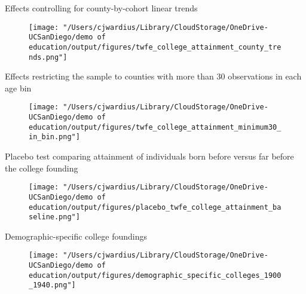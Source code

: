 \documentclass[notes,11pt, aspectratio=169]{beamer}
\begin{document}
\begin{frame}[label=county_trends]{Effects controlling for county-by-cohort linear trends}
  \begin{figure}
        \centering
        \texttt{[image: "/Users/cjwardius/Library/CloudStorage/OneDrive-UCSanDiego/demo of education/output/figures/twfe\_college\_attainment\_county\_trends.png"]}
    \end{figure}
    \centering
    \hyperlink{robustness}{}
\end{frame}

\begin{frame}[label=min30]{Effects restricting the sample to counties with more than 30 observations in each age bin}
  \begin{figure}
        \centering
        \texttt{[image: "/Users/cjwardius/Library/CloudStorage/OneDrive-UCSanDiego/demo of education/output/figures/twfe\_college\_attainment\_minimum30\_in\_bin.png"]}
    \end{figure}
    \centering
    \hyperlink{robustness}{}
\end{frame}


\begin{frame}[label=placebo]{Placebo test comparing attainment of individuals born before versus far before the college founding}
  \begin{figure}
        \centering
        \texttt{[image: "/Users/cjwardius/Library/CloudStorage/OneDrive-UCSanDiego/demo of education/output/figures/placebo\_twfe\_college\_attainment\_baseline.png"]}
    \end{figure}
    \centering
    \hyperlink{robustness}{}
\end{frame}


\begin{frame}[label=demo_specific]{Demographic-specific college foundings}
  \begin{figure}
 \texttt{[image: "/Users/cjwardius/Library/CloudStorage/OneDrive-UCSanDiego/demo of education/output/figures/demographic\_specific\_colleges\_1900\_1940.png"]}   
  \end{figure}
  \centering
  \hyperlink{next_steps}{}
\end{frame}
 
\end{document}
